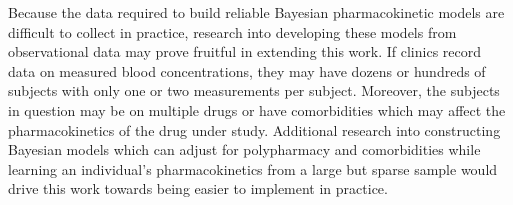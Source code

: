 Because the data required to build reliable Bayesian pharmacokinetic models are difficult to collect in practice, research into developing these models from observational data may prove fruitful in extending this work. If clinics record data on measured blood concentrations, they may have dozens or hundreds of subjects with only one or two measurements per subject.  Moreover, the subjects in question may be on multiple drugs or have comorbidities which may affect the pharmacokinetics of the drug under study.  Additional research into constructing Bayesian models which can adjust for polypharmacy and comorbidities while learning an individual’s pharmacokinetics from a large but sparse sample would drive this work towards being easier to implement in practice.


